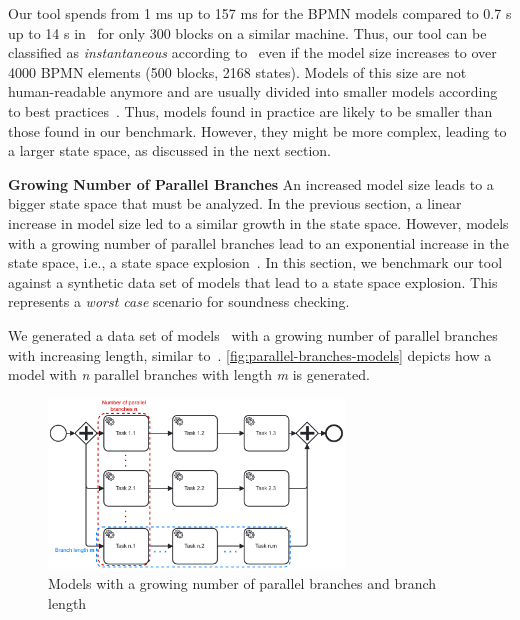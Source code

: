 \documentclass[runningheads]{llncs}
\newcommand{\subpart}[1]{\vspace{1em}\noindent\textbf{#1}}
\begin{document}
Our tool spends from 1 ms up to 157 ms for the BPMN models compared to 0.7 s up to 14 s in~\cite{krauterHigherorderTransformationApproach2023} for only 300 blocks on a similar machine.
Thus, our tool can be classified as \textit{instantaneous} according to~\cite{fahlandAnalysisDemandInstantaneous2011} even if the model size increases to over 4000 BPMN elements (500 blocks, 2168 states).
Models of this size are not human-readable anymore and are usually divided into smaller models according to best practices~\cite{fahlandAnalysisDemandInstantaneous2011}.
Thus, models found in practice are likely to be smaller than those found in our benchmark.
However, they might be more complex, leading to a larger state space, as discussed in the next section.

\subpart{Growing Number of Parallel Branches}
An increased model size leads to a bigger state space that must be analyzed.
In the previous section, a linear increase in model size led to a similar growth in the state space.
However, models with a growing number of parallel branches lead to an exponential increase in the state space, i.e., a state space explosion~\cite{clarkeHandbookModelChecking2018}.
In this section, we benchmark our tool against a synthetic data set of models that lead to a state space explosion.
This represents a \textit{worst case} scenario for soundness checking.

We generated a data set of models~\cite{noauthorgivenBPM2024Artifacts2024} with a growing number of parallel branches with increasing length, similar to~\cite{corradiniFormalApproachAnalysis2021}.
\autoref{fig:parallel-branches-models} depicts how a model with \textit{n} parallel branches with length \textit{m} is generated.

\begin{figure}[ht]
	\centering
	\includegraphics[width=0.7\textwidth]{images/parallel-branches}
	\caption{Models with a growing number of parallel branches and branch length}
	\label{fig:parallel-branches-models}
\end{figure}
\end{document}

